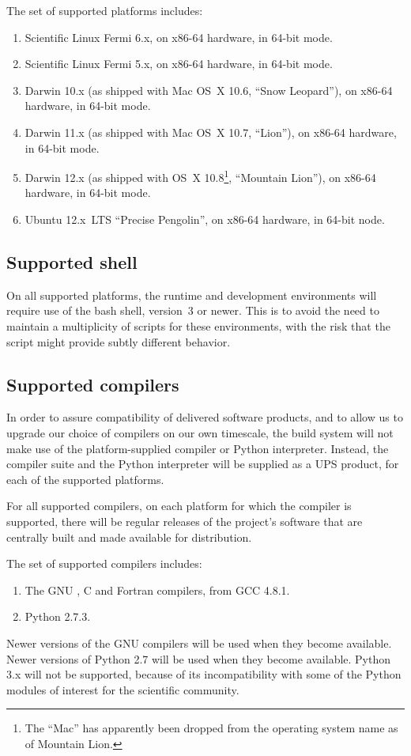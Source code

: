 \documentclass{memarticle}
\begin{document}
The set of supported platforms includes:
\begin{enumerate}
\item Scientific Linux Fermi 6.x, on x86-64 hardware, in 64-bit mode.
\item Scientific Linux Fermi 5.x, on x86-64 hardware, in 64-bit mode.
\item Darwin 10.x (as shipped with Mac OS~X 10.6, ``Snow Leopard''), on
  x86-64 hardware, in 64-bit mode.
\item Darwin 11.x (as shipped with Mac OS~X 10.7, ``Lion''), on x86-64
  hardware, in 64-bit mode.
\item Darwin 12.x (as shipped with OS~X 10.8\footnote{The ``Mac'' has
    apparently been dropped from the operating system name as of
    Mountain Lion.}, ``Mountain Lion''), on x86-64 hardware, in 64-bit
  mode.
\item Ubuntu 12.x~LTS ``Precise Pengolin'', on x86-64 hardware, in
  64-bit node.
\end{enumerate}

\subsection{Supported shell}

On all supported platforms, the runtime and development environments
will require use of the bash shell, version~3 or newer. This is to avoid
the need to maintain a multiplicity of scripts for these environments,
with the risk that the script might provide subtly different behavior.

\subsection{Supported compilers}

In order to assure compatibility of delivered software products, and to
allow us to upgrade our choice of compilers on our own timescale, the
build system will not make use of the platform-supplied compiler or
Python interpreter. Instead, the compiler suite and the Python
interpreter will be supplied as a UPS product, for each of the supported
platforms.

For all supported compilers, on each platform for which the compiler is
supported, there will be regular releases of the project's software that
are centrally built and made available for distribution.

The set of supported compilers includes:
\begin{enumerate}
\item The GNU \cpp{}, C and Fortran compilers, from GCC 4.8.1.
\item Python 2.7.3.
\end{enumerate}
Newer versions of the GNU compilers will be used when they become
available. Newer versions of Python 2.7 will be used when they become
available. Python 3.x will not be supported, because of its
incompatibility with some of the Python modules of interest for the
scientific community.
\end{document}
